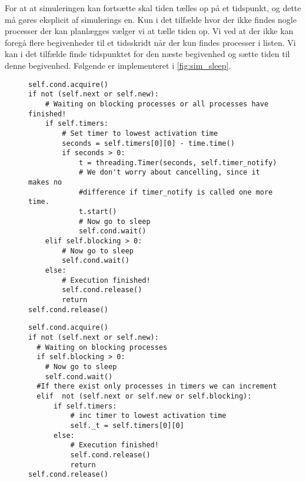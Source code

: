 For at at simuleringen kan fortsætte skal tiden tælles op på et tidspunkt, og dette må gøres eksplicit af simulerings \sched en.  Kun i det tilfælde hvor der ikke findes nogle processer der kan planlægges vælger vi at tælle tiden op. Vi ved at der ikke kan foregå flere begivenheder til et tidsskridt når der kun findes processer i  listen. Vi kan i det tilfælde finde tidspunktet for den næste begivenhed og sætte tiden til denne begivenhed. Følgende er implementeret i \cref{fig:sim_sleep}.
\begin{figure}[hbtp]
\begin{minipage}[c]{\linewidth}
\begin{lstlisting}[firstnumber=239, label=fig:blocking_sleep, caption=Uddrag af \sched en i \code{Scheduler}]
self.cond.acquire()
if not (self.next or self.new):
    # Waiting on blocking processes or all processes have finished!
    if self.timers:
        # Set timer to lowest activation time
        seconds = self.timers[0][0] - time.time()
        if seconds > 0:
            t = threading.Timer(seconds, self.timer_notify)
            # We don't worry about cancelling, since it makes no 
            #difference if timer_notify is called one more time.
            t.start()
            # Now go to sleep
            self.cond.wait()
    elif self.blocking > 0:
        # Now go to sleep
        self.cond.wait()
    else:
        # Execution finished!
        self.cond.release()
        return
self.cond.release()
\end{lstlisting}
\end{minipage}
\begin{minipage}[c]{\linewidth}
\begin{lstlisting}[firstnumber=158, label=fig:sim_sleep, caption= uddrag af \sched en i \code{Simulation}]
self.cond.acquire()
if not (self.next or self.new):
  # Waiting on blocking processes
  if self.blocking > 0:
    # Now go to sleep
    self.cond.wait()
  #If there exist only processes in timers we can increment
  elif  not (self.next or self.new or self.blocking): 
      if self.timers:
          # inc timer to lowest activation time
          self._t = self.timers[0][0]
      else:
          # Execution finished!
          self.cond.release()
          return
self.cond.release()  
\end{lstlisting}
\end{minipage}
\end{figure}

